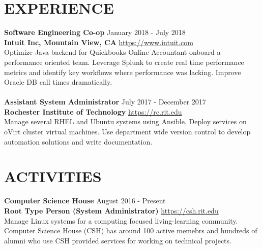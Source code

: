 \documentclass[line, margin, 11pt]{res}
\begin{document}
\begin{resume}
\section{EXPERIENCE}
{\bf \large{Software Engineering Co-op}} \hfill January 2018 - July 2018 \\
{\bf Intuit Inc, Mountain View, CA} \hfill \url{https://www.intuit.com} \\
Optimize Java backend for Quickbooks Online Accountant onboard a performance oriented team.  Leverage Splunk to create real
time performance metrics and identify key workflows where performance was lacking.  Improve Oracle DB call times dramatically.
\\
\\
{\bf \large{Assistant System Administrator}} \hfill July 2017 - December 2017 \\
{\bf Rochester Institute of Technology} \hfill \url{https://rc.rit.edu} \\
Manage several RHEL and Ubuntu systems using Ansible.  Deploy services on oVirt cluster virtual machines.  Use department wide version control to
develop automation solutions and write documentation.

\section{ACTIVITIES}
{\bf \large{Computer Science House}} \hfill August 2016 - Present \\
{\bf Root Type Person (System Administrator)} \hfill \url{https://csh.rit.edu} \\
Manage Linux systems for a computing focused living-learning community.
Computer Science House (CSH) has around 100 active memebrs and hundreds of alumni
who use CSH provided services for working on technical projects.

\end{resume}
\end{document}
